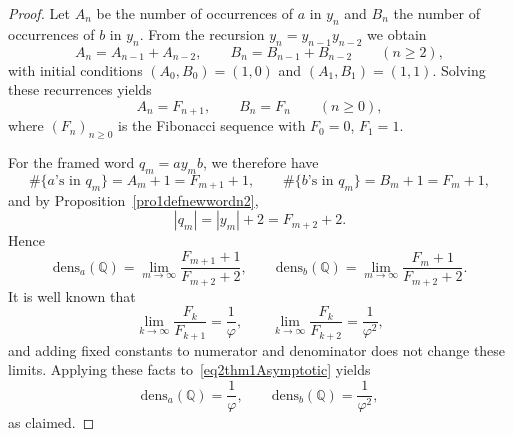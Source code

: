\documentclass[10pt,a4paper]{amsart}
\newcommand{\dens}{\mathrm{dens}}
\begin{document}
\begin{proof}
Let $A_n$ be the number of occurrences of $a$ in $y_n$ and $B_n$ the number of occurrences of $b$ in $y_n$. From the recursion $y_n = y_{n-1}y_{n-2}$ we obtain
\[
A_n = A_{n-1} + A_{n-2},\qquad B_n = B_{n-1} + B_{n-2} \qquad (n \ge 2),
\]
with initial conditions $(A_0,B_0) = (1,0)$ and $(A_1,B_1) = (1,1)$. Solving these recurrences yields
\[
A_n = F_{n+1},\qquad B_n = F_n \qquad (n \ge 0),
\]
where $(F_n)_{n\ge 0}$ is the Fibonacci sequence with $F_0=0$, $F_1=1$.

For the framed word $q_m = a y_m b$, we therefore have
\[
\#\{\text{$a$'s in } q_m\} = A_m + 1 = F_{m+1} + 1,\qquad
\#\{\text{$b$'s in } q_m\} = B_m + 1 = F_m + 1,
\]
and by Proposition~\ref{pro1defnewwordn2},
\[
|q_m| = |y_m| + 2 = F_{m+2} + 2.
\]
Hence
\begin{equation}\label{eq2thm1Asymptotic}
\dens_a(\mathbb{Q}) = \lim_{m \to \infty} \frac{F_{m+1} + 1}{F_{m+2} + 2},
\qquad
\dens_b(\mathbb{Q}) = \lim_{m \to \infty} \frac{F_m + 1}{F_{m+2} + 2}.
\end{equation}
It is well known that
\[
\lim_{k \to \infty} \frac{F_k}{F_{k+1}} = \frac{1}{\varphi},
\qquad
\lim_{k \to \infty} \frac{F_k}{F_{k+2}} = \frac{1}{\varphi^2},
\]
and adding fixed constants to numerator and denominator does not change these limits. Applying these facts to~\eqref{eq2thm1Asymptotic} yields
\[
\dens_a(\mathbb{Q}) = \frac{1}{\varphi},\qquad
\dens_b(\mathbb{Q}) = \frac{1}{\varphi^2},
\]
as claimed.
\end{proof}
\end{document}
